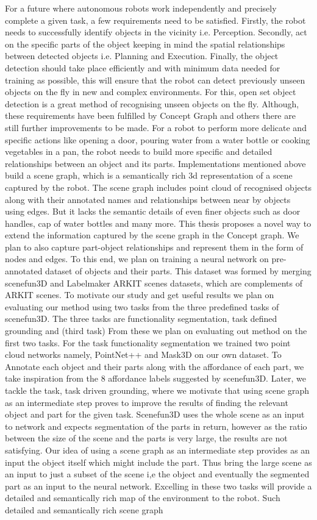For a future where autonomous robots work independently and precisely complete a given task, a few requirements need to be satisfied. Firstly, the robot needs to successfully identify objects in the vicinity i.e. Perception. Secondly, act on the specific parts of the object keeping in mind the spatial relationships between detected objects i.e. Planning and Execution. Finally, the object detection should take place efficiently and with minimum data needed for training as possible, this will ensure that the robot can detect previously unseen objects on the fly in new and complex environments. For this, open set object detection is a great method of recognising unseen objects on the fly. Although, these requirements have been fulfilled by Concept Graph and others there are still further improvements to be made. For a robot to perform more delicate and specific actions like opening a door, pouring water from a water bottle or cooking vegetables in a pan, the robot needs to build more specific and detailed relationships between an object and its parts. Implementations mentioned above build a scene graph, which is a semantically rich 3d representation of a scene captured by the robot. The scene graph includes point cloud of recognised objects along with their annotated names and relationships between near by objects using edges. But it lacks the semantic details of even finer objects such as door handles, cap of water bottles and many more. This thesis proposes a novel way to extend the information captured by the scene graph in the Concept graph. We plan to also capture part-object relationships and represent them in the form of nodes and edges. To this end, we plan on training a neural network on pre-annotated dataset of objects and their parts. This dataset was formed by merging scenefun3D and Labelmaker ARKIT scenes datasets, which are complements of ARKIT scenes. To motivate our study and get useful results we plan on evaluating our method using two tasks from the three predefined tasks of scenefun3D. The three tasks are functionality segmentation, task defined grounding and (third task) From these we plan on evaluating out method on the first two tasks. For the task functionality segmentation we trained two point cloud networks namely, PointNet++ and Mask3D on our own dataset. To Annotate each object and their parts along with the affordance of each part, we take inspiration from the 8 affordance labels suggested by scenefun3D. Later, we tackle the task, task driven grounding, where we motivate that using scene graph as an intermediate step proves to improve the results of finding the relevant object and part for the given task. Scenefun3D uses the whole scene as an input to network and expects segmentation of the parts in return, however as the ratio between the size of the scene and the parts is very large, the results are not satisfying. Our idea of using a scene graph as an intermediate step provides as an input the object itself which might include the part. Thus bring the large scene as an input to just a subset of the scene i,e the object and eventually the segmented part as an input to the neural network. Excelling in these two tasks will provide a detailed and semantically rich map of the environment to the robot. Such detailed and semantically rich scene graph 